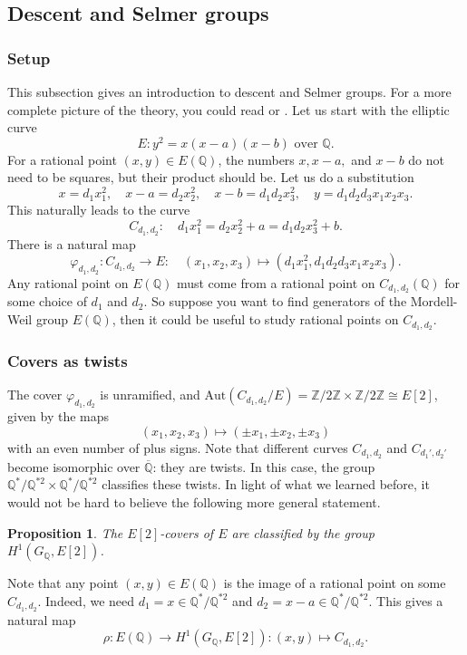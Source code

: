 \documentclass[12pt]{article}
\newtheorem{proposition}[theorem]{Proposition}
\theoremstyle{definition}
\numberwithin{equation}{subsection}
\newcommand{\Q}{\ensuremath{\mathbb{Q}}}
\newcommand{\Z}{\ensuremath{\mathbb{Z}}}
\begin{document}
\subsection{Descent and Selmer groups}

\subsubsection{Setup}

This subsection gives an introduction to descent and Selmer groups.
For a more complete picture of the theory, you could read \cite{descent} or \cite[Chap.\ X]{SilvermanBook}.
Let us start with the elliptic curve
$$E \colon y^2 = x(x-a)(x-b) \textrm{ over } \Q.$$
For a rational point $(x,y) \in E(\Q)$, the numbers $x, x-a,$ and $x-b$ do not need to be squares, but their product should be.
Let us do a substitution
$$x = d_1 x_1^2, \quad x-a = d_2 x_2^2, \quad x-b = d_1d_2 x_3^2, \quad y = d_1d_2d_3 x_1x_2x_3.$$
This naturally leads to the curve
$$C_{d_1,d_2} \colon \quad d_1x_1^2 = d_2x_2^2 + a = d_1d_2x_3^2 + b.$$
There is a natural map
$$\varphi_{d_1,d_2} \colon C_{d_1,d_2} \to E \colon \quad (x_1, x_2, x_3) \mapsto (d_1x_1^2, d_1d_2d_3x_1x_2x_3).$$
Any rational point on $E(\Q)$ must come from a rational point on $C_{d_1,d_2}(\Q)$ for some choice of $d_1$ and $d_2$.
So suppose you want to find generators of the Mordell-Weil group $E(\Q)$, then it could be useful to study rational points on $C_{d_1,d_2}$.

\subsubsection{Covers as twists}

The cover $\varphi_{d_1,d_2}$ is unramified, and $\mathrm{Aut}(C_{d_1,d_2}/E) = \Z/2\Z \times \Z/2\Z \cong E[2]$, given by the maps $$(x_1,x_2,x_3) \mapsto (\pm x_1, \pm x_2, \pm x_3)$$ with an even number of plus signs.
Note that different curves $C_{d_1,d_2}$ and $C_{d_1',d_2'}$ become isomorphic over $\overline{\Q}$: they are twists.
In this case, the group $\Q^*/\Q^{*2} \times \Q^*/\Q^{*2}$ classifies these twists.
In light of what we learned before, it would not be hard to believe the following more general statement.

\begin{proposition}
The $E[2]$-covers of $E$ are classified by the group $H^1(G_{\Q}, E[2])$.
\end{proposition}

Note that any point $(x,y) \in E(\Q)$ is the image of a rational point on some $C_{d_1,d_2}$. Indeed, we need $d_1 = x \in \Q^* / \Q^{*2}$ and $d_2 = x - a \in \Q^*/\Q^{*2}$. This gives a natural map
$$\rho \colon E(\Q) \to H^1(G_\Q, E[2]) : (x,y) \mapsto C_{d_1,d_2}.$$
\end{document}
